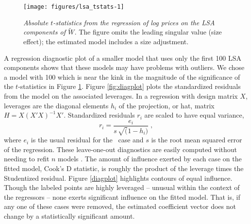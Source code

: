 \documentclass[12pt]{article}\usepackage[]{graphicx}\usepackage[]{color}
\newenvironment{knitrout}{}{} %
\begin{document}
\begin{figure}
\begin{knitrout}
\color{fgcolor}

{\centering \texttt{[image: figures/lsa\_tstats-1]} 

}



\end{knitrout}

\caption{  \label{fig:lsatstats}
 {\sl Absolute $t$-statistics from the regression of log prices on the
 LSA components of $\widetilde{W}$.} The figure omits the leading
 singular value (size effect); the estimated model includes a size
 adjustment. }
\end{figure}


 A regression diagnostic plot of a smaller model that uses only the
 first 100 LSA components shows that these models may have problems
 with outliers.  We chose a model with 100 which is near the kink in
 the magnitude of the significance of the $t$-statistics in Figure
 \ref{fig:lsatstats}.  Figure \ref{fig:diagplot} plots the standardized
 residuals from the model on the associated leverages.  In a
 regression with design matrix $X$, leverages are the diagonal
 elements $h_{i}$ of the projection, or hat, matrix $H =
 X(X'X)^{-1}X'$.  Standardized residuals $r_i$ are scaled to have
 equal variance,
 \begin{equation}
     r_i = \frac{e_i}{s\, \sqrt(1-h_i)} \;,
 \label{eq:sres}
 \end{equation}
 where $e_i$ is the usual residual for the \ith\ case and $s$ is the
 root mean squared error of the regression.  These leave-one-out
 diagnostics are easily computed without needing to refit $n$ models
 \citep{belsley80}.  The amount of influence exerted by each case on
 the fitted model, Cook's D statistic, is roughly the product of the
 leverage times the Studentized residual. Figure \ref{diagplot}
 highlights contours of equal influence.  Though the labeled points
 are highly leveraged -- unusual within the context of the regressors
 -- none exerts significant influence on the fitted model.  That is,
 if any one of these cases were removed, the estimated coefficient
 vector does not change by a statistically significant amount.
\end{document}
